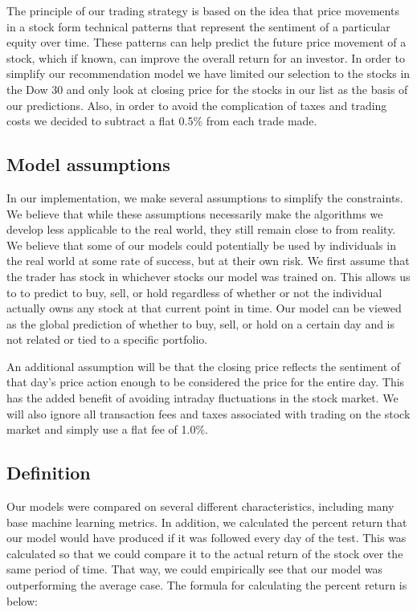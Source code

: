 \documentclass{article}
\begin{document}
The principle of our trading strategy is based on the idea that price movements in a stock form technical patterns that represent the sentiment of a particular equity over time. These patterns can help predict the future price movement of a stock, which if known, can improve the overall return for an investor.  In order to simplify our recommendation model we have limited our selection to the stocks in the Dow 30 and only look at closing price for the stocks in our list as the basis of our predictions.  Also, in order to avoid the complication of taxes and trading costs we decided to subtract a flat 0.5\% from each trade made.

\subsection{Model assumptions}
In our implementation, we make several assumptions to simplify the constraints. We believe that while these assumptions necessarily make the algorithms we develop less applicable to the real world, they still remain close to from reality. We believe that some of our models could potentially be used by individuals in the real world at some rate of success, but at their own risk. We first assume that the trader has stock in whichever stocks our model was trained on. This allows us to to predict to buy, sell, or hold regardless of whether or not the individual actually owns any stock at that current point in time. Our model can be viewed as the global prediction of whether to buy, sell, or hold on a certain day and is not related or tied to a specific portfolio.

An additional assumption will be that the closing price reflects the sentiment of that day's price action enough to be considered the price for the entire day. This has the added benefit of avoiding intraday fluctuations in the stock market. We will also ignore all transaction fees and taxes associated with trading on the stock market and simply use a flat fee of 1.0\%.

\subsection{Definition}
Our models were compared on several different characteristics, including many base machine learning metrics. In addition, we calculated the percent return that our model would have produced if it was followed every day of the test. This was calculated so that we could compare it to the actual return of the stock over the same period of time. That way, we could empirically see that our model was outperforming the average case. The formula for calculating the percent return is below:
\end{document}
